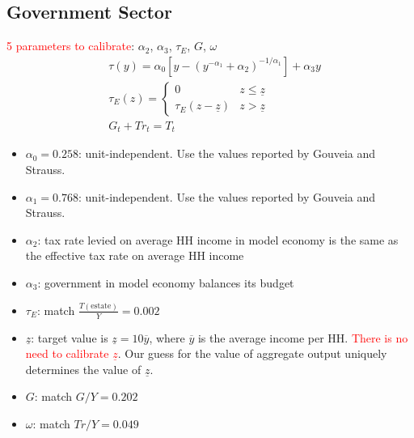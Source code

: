 \documentclass{article}
\begin{document}
\begin{spacing}{1.5}
\subsection*{Government Sector}
\textcolor{red}{5 parameters to calibrate}: $\alpha_2$, $\alpha_3$, $\tau_E$, $G$, $\omega$
\begin{align*}
&\tau(y)=\alpha_0[y-(y^{-\alpha_1}+\alpha_2)^{-1/\alpha_1}]+\alpha_3y\\
&\tau_E(z)=\left\{\begin{array}{cc} 0 & z\leq\underline{z}\\ \tau_E(z-\underline{z}) & z>\underline{z} \end{array} \right.\\
&G_t+Tr_t=T_t
\end{align*}
\begin{itemize}
\item $\alpha_0=0.258$: unit-independent. Use the values reported by Gouveia and Strauss.
\item $\alpha_1=0.768$: unit-independent. Use the values reported by Gouveia and Strauss.
\item $\alpha_2$: tax rate levied on average HH income in model economy is the same as the effective tax rate on average HH income
\item $\alpha_3$: government in model economy balances its budget
\item $\tau_E$: match $\frac{T(\text{estate})}{Y}=0.002$
\item $\underline{z}$: target value is $\underline{z}=10\overline{y}$, where $\overline{y}$ is the average income per HH. \textcolor{red}{There is no need to calibrate $\underline{z}$}. Our guess for the value of aggregate output uniquely determines the value of $\underline{z}$.
\item $G$: match $G/Y=0.202$
\item $\omega$: match $Tr/Y=0.049$
\end{itemize}


\end{spacing}
\end{document}
